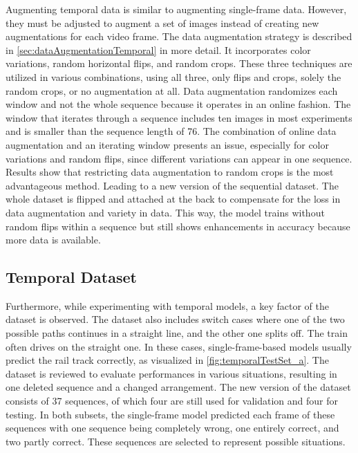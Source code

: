 Augmenting temporal data is similar to augmenting single-frame data.
However, they must be adjusted to augment a set of images instead of creating new augmentations for each video frame.
The data augmentation strategy is described in \autoref{sec:dataAugmentationTemporal} in more detail.
It incorporates color variations, random horizontal flips, and random crops.
These three techniques are utilized in various combinations, using all three, only flips and crops, solely the random crops, or no augmentation at all.
Data augmentation randomizes each window and not the whole sequence because it operates in an online fashion.
The window that iterates through a sequence includes ten images in most experiments and is smaller than the sequence length of 76.
The combination of online data augmentation and an iterating window presents an issue, especially for color variations and random flips, since different variations can appear in one sequence.
Results show that restricting data augmentation to random crops is the most advantageous method.
Leading to a new version of the sequential dataset.
The whole dataset is flipped and attached at the back to compensate for the loss in data augmentation and variety in data.
This way, the model trains without random flips within a sequence but still shows enhancements in accuracy because more data is available.

\subsection{Temporal Dataset}

Furthermore, while experimenting with temporal models, a key factor of the dataset is observed.
The dataset also includes switch cases where one of the two possible paths continues in a straight line, and the other one splits off.
The train often drives on the straight one.
In these cases, single-frame-based models usually predict the rail track correctly, as visualized in \autoref{fig:temporalTestSet_a}.
The dataset is reviewed to evaluate performances in various situations, resulting in one deleted sequence and a changed arrangement.
The new version of the dataset consists of 37 sequences, of which four are still used for validation and four for testing.
In both subsets, the single-frame model predicted each frame of these sequences with one sequence being completely wrong, one entirely correct, and two partly correct.
These sequences are selected to represent possible situations.


